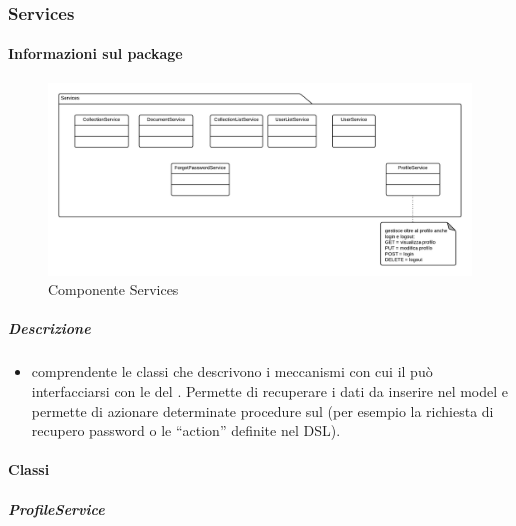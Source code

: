   \subsubsection{Services}
  \paragraph{Informazioni sul package}
    \begin{figure}[H] 
      \begin{center}
        \includegraphics[width=\textwidth]{uml/package/Front-end::Services.png}
        \caption{Componente Services}
      \end{center}  
    \end{figure} 
  \subparagraph{Descrizione} 
    \begin{itemize}
    \item[]  comprendente le classi che descrivono i meccanismi con cui il  può interfacciarsi con le  del . Permette di recuperare i dati da inserire nel model e permette di azionare determinate procedure sul  (per esempio la richiesta di recupero password o le ``action'' definite nel DSL).
    \end{itemize} 
    \paragraph{Classi}
      \subparagraph{ProfileService}
        
